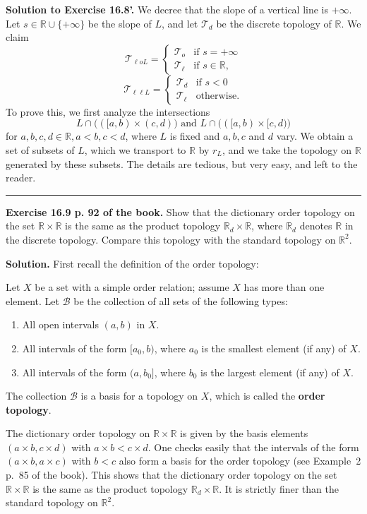 \documentclass[12pt,letterpaper]{article}
\newcommand{\hs}{\bigskip\hrule\medskip}
\newcommand{\noi}{\noindent}%
\newcommand{\R}{\mathbb R}
\newcommand{\T}{\mathcal T}
\begin{document}
\noi\textbf{Solution to Exercise 16.8'.} We decree that the slope of a vertical line is $+\infty$. Let $s\in\R\cup\{+\infty\}$ be the slope of $L$, and let $\T_d$ be the discrete topology of $\R$. We claim 
$$
\T_{\ell oL}=
\begin{cases}
\T_o&\text{if }s=+\infty\\ 
\T_\ell&\text{if }s\in\R,
\end{cases}
$$ 
$$
\T_{\ell\ell L}=
\begin{cases}
\T_d&\text{if }s<0\\ 
\T_\ell&\text{otherwise.}
\end{cases}
$$ 
To prove this, we first analyze the intersections 
$$
L\cap\big(([a,b)\times(c,d)\big)\text{ and }L\cap\big(([a,b)\times[c,d)\big)
$$ 
for $a,b,c,d\in\R,a<b,c<d$, where $L$ is fixed and $a,b,c$ and $d$ vary. We obtain a set of subsets of $L$, which we transport to $\R$ by $r_L$, and we take the topology on $\R$ generated by these subsets. The details are tedious, but very easy, and left to the reader. 

\hs

\noi\textbf{Exercise 16.9 p. 92 of the book.} Show that the dictionary order topology on the set $\R\times\R$ is the same as the product topology $\R_d\times\R$, where $\R_d$ denotes $\R$ in the discrete topology. Compare this topology with the standard topology on $\R^2$. 

\noi\textbf{Solution.} First recall the definition of the order topology: 

Let $X$ be a set with a simple order relation; assume $X$ has more than one element. Let $\mathcal{B}$ be the collection of all sets of the following types:
\begin{enumerate}
    \item All open intervals $(a,b)$ in $X$.
    \item All intervals of the form $[a_0,b)$, where $a_0$ is the smallest element (if any) of $X$.
    \item All intervals of the form $(a,b_0]$, where $b_0$ is the largest element (if any) of $X$.
\end{enumerate}
The collection $\mathcal{B}$ is a basis for a topology on $X$, which is called the \textbf{order topology}. 

The dictionary order topology on $\R\times\R$ is given by the basis elements $(a\times b,c\times d)$ with $a\times b<c\times d$. One checks easily that the intervals of the form $(a\times b,a\times c)$ with $b<c$ also form a basis for the order topology (see Example~2 p.~85 of the book). This shows that the dictionary order topology on the set $\R\times\R$ is the same as the product topology $\R_d\times\R$. It is strictly finer than the standard topology on $\R^2$. 
\end{document}
